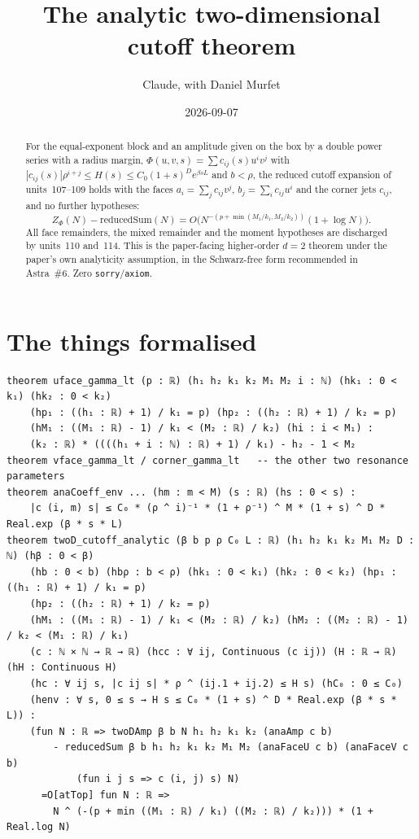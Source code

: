 \documentclass[11pt]{article}
\title{The analytic two-dimensional cutoff theorem}
\author{Claude, with Daniel Murfet}
\date{2026-09-07}
\begin{document}
\maketitle
\sloppy

\begin{abstract}
For the equal-exponent block and an amplitude given on the box by a double power series with a radius
margin, $\Phi(u,v,s)=\sum c_{ij}(s)u^iv^j$ with $|c_{ij}(s)|\rho^{i+j}\le H(s)\le C_0(1+s)^De^{\beta sL}$
and $b<\rho$, the reduced cutoff expansion of units~107--109 holds with the faces
$a_i=\sum_jc_{ij}v^j$, $b_j=\sum_ic_{ij}u^i$ and the corner jets $c_{ij}$, and no further hypotheses:
\[
Z_\Phi(N)-\mathrm{reducedSum}(N)=O\bigl(N^{-(p+\min(M_1/k_1,M_2/k_2))}(1+\log N)\bigr).
\]
All face remainders, the mixed remainder and the moment hypotheses are discharged by units~110 and~114.
This is the paper-facing higher-order $d=2$ theorem under the paper's own analyticity assumption, in the
Schwarz-free form recommended in Astra~\#6. Zero \texttt{sorry}/\texttt{axiom}.
\end{abstract}

\section{The things formalised}
{\small
\begin{verbatim}
theorem uface_gamma_lt (p : ℝ) (h₁ h₂ k₁ k₂ M₁ M₂ i : ℕ) (hk₁ : 0 < k₁) (hk₂ : 0 < k₂)
    (hp₁ : ((h₁ : ℝ) + 1) / k₁ = p) (hp₂ : ((h₂ : ℝ) + 1) / k₂ = p)
    (hM₁ : ((M₁ : ℝ) - 1) / k₁ < (M₂ : ℝ) / k₂) (hi : i < M₁) :
    (k₂ : ℝ) * ((((h₁ + i : ℕ) : ℝ) + 1) / k₁) - h₂ - 1 < M₂
theorem vface_gamma_lt / corner_gamma_lt   -- the other two resonance parameters
theorem anaCoeff_env ... (hm : m < M) (s : ℝ) (hs : 0 < s) :
    |c (i, m) s| ≤ C₀ * (ρ ^ i)⁻¹ * (1 + ρ⁻¹) ^ M * (1 + s) ^ D * Real.exp (β * s * L)
theorem twoD_cutoff_analytic (β b p ρ C₀ L : ℝ) (h₁ h₂ k₁ k₂ M₁ M₂ D : ℕ) (hβ : 0 < β)
    (hb : 0 < b) (hbρ : b < ρ) (hk₁ : 0 < k₁) (hk₂ : 0 < k₂) (hp₁ : ((h₁ : ℝ) + 1) / k₁ = p)
    (hp₂ : ((h₂ : ℝ) + 1) / k₂ = p)
    (hM₁ : ((M₁ : ℝ) - 1) / k₁ < (M₂ : ℝ) / k₂) (hM₂ : ((M₂ : ℝ) - 1) / k₂ < (M₁ : ℝ) / k₁)
    (c : ℕ × ℕ → ℝ → ℝ) (hcc : ∀ ij, Continuous (c ij)) (H : ℝ → ℝ) (hH : Continuous H)
    (hc : ∀ ij s, |c ij s| * ρ ^ (ij.1 + ij.2) ≤ H s) (hC₀ : 0 ≤ C₀)
    (henv : ∀ s, 0 ≤ s → H s ≤ C₀ * (1 + s) ^ D * Real.exp (β * s * L)) :
    (fun N : ℝ => twoDAmp β b N h₁ h₂ k₁ k₂ (anaAmp c b)
        - reducedSum β b h₁ h₂ k₁ k₂ M₁ M₂ (anaFaceU c b) (anaFaceV c b)
            (fun i j s => c (i, j) s) N)
      =O[atTop] fun N : ℝ =>
        N ^ (-(p + min ((M₁ : ℝ) / k₁) ((M₂ : ℝ) / k₂))) * (1 + Real.log N)
\end{verbatim}
}
\end{document}
